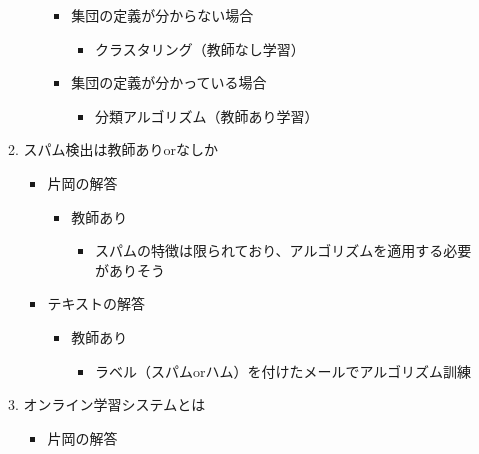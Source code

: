 \begin{itemize}
\begin{enumerate}
\begin{itemize}
      \begin{itemize}
      \tightlist
      \item
        集団の定義が分からない場合

        \begin{itemize}
        \tightlist
        \item
          クラスタリング（教師なし学習）
        \end{itemize}
      \item
        集団の定義が分かっている場合

        \begin{itemize}
        \tightlist
        \item
          分類アルゴリズム（教師あり学習）
        \end{itemize}
      \end{itemize}
    \end{itemize}
  \item
    スパム検出は教師ありorなしか

    \begin{itemize}
    \tightlist
    \item
      片岡の解答

      \begin{itemize}
      \tightlist
      \item
        教師あり

        \begin{itemize}
        \tightlist
        \item
          スパムの特徴は限られており、アルゴリズムを適用する必要がありそう
        \end{itemize}
      \end{itemize}
    \item
      テキストの解答

      \begin{itemize}
      \tightlist
      \item
        教師あり

        \begin{itemize}
        \tightlist
        \item
          ラベル（スパムorハム）を付けたメールでアルゴリズム訓練
        \end{itemize}
      \end{itemize}
    \end{itemize}
  \item
    オンライン学習システムとは

    \begin{itemize}
    \tightlist
    \item
      片岡の解答


\end{itemize}
\end{enumerate}
\end{itemize}
